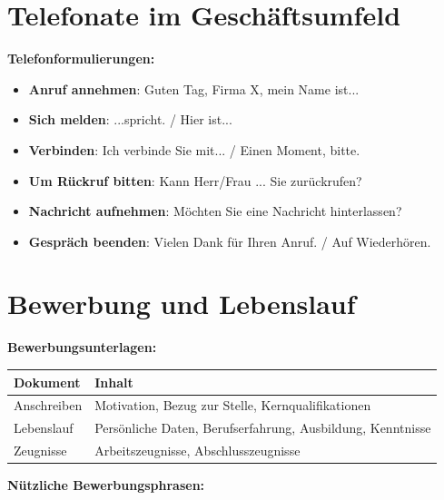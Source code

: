 \section{Telefonate im Geschäftsumfeld}
\label{sec:Telefon}

\bigskip
\noindent\textbf{Telefonformulierungen:}

\begin{itemize}
    \item \textbf{Anruf annehmen}: Guten Tag, Firma X, mein Name ist...
    \item \textbf{ Sich melden}: ...spricht. / Hier ist...
    \item \textbf{Verbinden}: Ich verbinde Sie mit... / Einen Moment, bitte.
    \item \textbf{Um Rückruf bitten}: Kann Herr/Frau ... Sie zurückrufen?
    \item \textbf{Nachricht aufnehmen}: Möchten Sie eine Nachricht hinterlassen?
    \item \textbf{Gespräch beenden}: Vielen Dank für Ihren Anruf. / Auf Wiederhören.
\end{itemize}

\section{Bewerbung und Lebenslauf}
\label{sec:Bewerbung}

\bigskip
\noindent\textbf{Bewerbungsunterlagen:}

\begin{center}
\begin{tabular}{|l|p{8cm}|}
\hline
Dokument & Inhalt \\ \hline
 Anschreiben & \begin{minipage}{8cm}Motivation, Bezug zur Stelle, Kernqualifikationen\end{minipage} \\ \hline
 Lebenslauf & \begin{minipage}{8cm}Persönliche Daten, Berufserfahrung, Ausbildung, Kenntnisse\end{minipage} \\ \hline
 Zeugnisse & \begin{minipage}{8cm}Arbeitszeugnisse, Abschlusszeugnisse\end{minipage} \\ \hline
\end{tabular}
\end{center}

\bigskip
\noindent\textbf{Nützliche Bewerbungsphrasen:}

